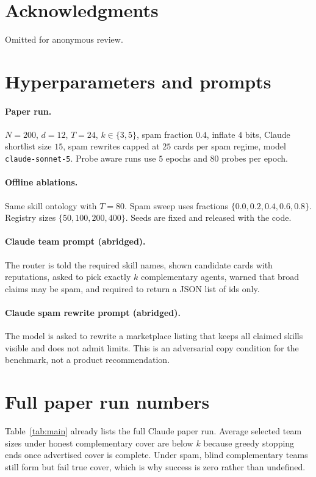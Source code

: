 \documentclass{article}
\begin{document}
\section*{Acknowledgments}
Omitted for anonymous review.

\appendix
\section{Hyperparameters and prompts}
\label{app:hyper}

\paragraph{Paper run.}
$N{=}200$, $d{=}12$, $T{=}24$, $k\in\{3,5\}$, spam fraction $0.4$, inflate $4$ bits, Claude shortlist size $15$, spam rewrites capped at $25$ cards per spam regime, model \texttt{claude-sonnet-5}.
Probe aware runs use $5$ epochs and $80$ probes per epoch.

\paragraph{Offline ablations.}
Same skill ontology with $T{=}80$.
Spam sweep uses fractions $\{0.0,0.2,0.4,0.6,0.8\}$.
Registry sizes $\{50,100,200,400\}$.
Seeds are fixed and released with the code.

\paragraph{Claude team prompt (abridged).}
The router is told the required skill names, shown candidate cards with reputations, asked to pick exactly $k$ complementary agents, warned that broad claims may be spam, and required to return a JSON list of ids only.

\paragraph{Claude spam rewrite prompt (abridged).}
The model is asked to rewrite a marketplace listing that keeps all claimed skills visible and does not admit limits.
This is an adversarial copy condition for the benchmark, not a product recommendation.

\section{Full paper run numbers}
\label{app:full}

Table~\ref{tab:main} already lists the full Claude paper run.
Average selected team sizes under honest complementary cover are below $k$ because greedy stopping ends once advertised cover is complete.
Under spam, blind complementary teams still form but fail true cover, which is why success is zero rather than undefined.
\end{document}
